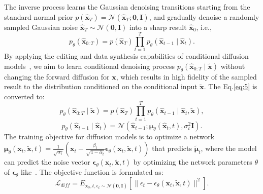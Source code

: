 The inverse process learns the Gaussian denoising transitions starting from the standard normal prior $p(\mathbf{\hat{x}}_T)=\mathcal{N}(\mathbf{\hat{x}}_T;\mathbf{0},\mathbf{I})$, and gradually denoise a randomly sampled Gaussian noise $\mathbf{\hat{x}}_T \sim \mathcal{N}(\mathbf{0},\mathbf{I})$ into a sharp result $\mathbf{\hat{x}}_0$, i.e.,
\begin{equation}\label{eq:5}
	p_\theta(\mathbf{\hat{x}}_{0:T})=p(\mathbf{\hat{x}}_T) \prod_{t=1}^T p_\theta(\mathbf{\hat{x}}_{t-1} \mid \mathbf{\hat{x}}_t).
\end{equation}
By applying the editing and data synthesis capabilities of conditional diffusion models~\cite{conditional_ddpm}, we aim to learn conditional denoising process $p_\theta(\mathbf{\hat{x}}_{0:T} \mid \tilde{\mathbf{x}})$ without changing the forward diffusion for $\mathbf{x}$, which results in high fidelity of the sampled result to the distribution conditioned on the conditional input $\tilde{\mathbf{x}}$. The Eq.\ref{eq:5} is converted to:
\begin{equation}\label{eq:6}
	p_\theta(\mathbf{\hat{x}}_{0:T} \mid \tilde{\mathbf{x}})=p(\mathbf{\hat{x}}_T) \prod_{t=1}^T p_\theta(\mathbf{\hat{x}}_{t-1} \mid \mathbf{\hat{x}}_t, \tilde{\mathbf{x}}),
\end{equation}
\begin{equation}\label{eq:7}
	p_\theta(\mathbf{\hat{x}}_{t-1} \mid \mathbf{\hat{x}}_t)=\mathcal{N}(\mathbf{\hat{x}}_{t-1};\boldsymbol{\mu}_\theta(\mathbf{\hat{x}}_t, t), \sigma_t^2 \mathbf{I}).
\end{equation}
The training objective for diffusion models is to optimize a network $\boldsymbol{\mu}_\theta(\mathbf{x}_t, \tilde{\mathbf{x}}, t)=\frac{1}{\sqrt{\alpha_t}}(\mathbf{x}_t-\frac{\beta_t}{\sqrt{1-\bar{\alpha}_t}} \boldsymbol{\epsilon}_\theta(\mathbf{x}_t, \tilde{\mathbf{x}}, t))$ that predicts $\tilde{\boldsymbol{\mu}}_t$, where the model can predict the noise vector $\boldsymbol{\epsilon}_\theta(\mathbf{x}_t, \tilde{\mathbf{x}}, t)$ by optimizing the network parameters $\theta$ of $\boldsymbol{\epsilon}_\theta$ like~\cite{ddpm}. The objective function is formulated as:
\begin{equation}\label{eq:8}
	\mathcal{L}_{diff} = E_{\mathbf{x}_0, t, \epsilon_t \sim \mathcal{N}(\mathbf{0},\mathbf{I})}[\|\epsilon_t-\epsilon_\theta(\mathbf{x}_t, \tilde{\mathbf{x}}, t)\|^2].
\end{equation}

